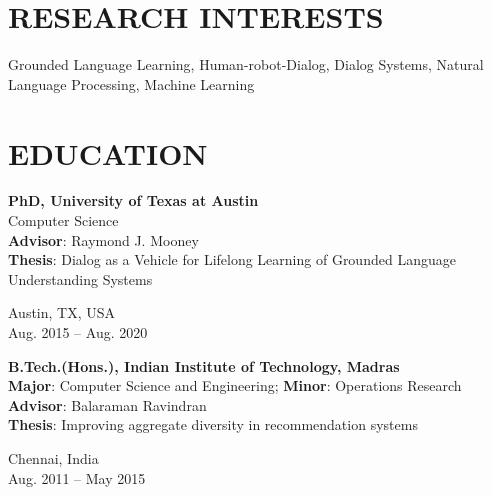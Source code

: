 \documentclass[letterpaper,10pt]{resume}
\author{\textcolor{grey}{Aishwarya Padmakumar}}
\begin{document}
\lsstyle
{
\resumeheader

\section{RESEARCH INTERESTS}
Grounded Language Learning, Human-robot-Dialog, Dialog Systems, Natural Language Processing, Machine Learning
\vspace{0.2cm}

\section{EDUCATION}

\begin{minipage}[t]{0.8\textwidth}
	{\sf \textbf{PhD, University of Texas at Austin}} \\
	Computer Science \\
	{\small \sf \textbf{Advisor}: Raymond J. Mooney} \\
	{\small \sf \textbf{Thesis}: Dialog as a Vehicle for Lifelong Learning of Grounded Language Understanding Systems} \\	
	
\end{minipage}\begin{minipage}[t]{0.2\textwidth} 
	\begin{flushright}
		{\small \sf Austin, TX, USA} \\
		{\sf Aug. 2015 -- Aug. 2020}
	\end{flushright}		
\end{minipage}
\vspace{0.3cm}

\begin{minipage}[t]{0.8\textwidth}
	{\sf \textbf{B.Tech.(Hons.), Indian Institute of Technology, Madras}} \\
	{\small \sf\textbf{Major}}: Computer Science and Engineering; {\small \sf\textbf{Minor}}: Operations Research \\
	{\small \sf \textbf{Advisor}: Balaraman Ravindran} \\
	{\small \sf \textbf{Thesis}: Improving aggregate diversity in recommendation systems} \\	
	
\end{minipage}\begin{minipage}[t]{0.2\textwidth} 
	\begin{flushright}
		{\small \sf Chennai, India} \\
		{\sf Aug. 2011 -- May 2015}
	\end{flushright}		
\end{minipage}
\vspace{0.1cm}


}
\end{document}
